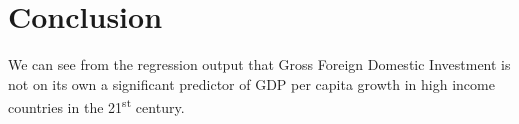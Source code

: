 \documentclass{article}
\begin{document}
\section{Conclusion}
\quad We can see from the regression output that Gross Foreign Domestic Investment is not on its own a significant predictor of GDP per capita growth in high income countries in the 21\textsuperscript{st} century.
\newpage
\begin{thebibliography}{9}

\end{thebibliography}
\end{document}
